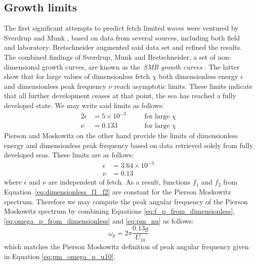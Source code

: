 \subsection{Growth limits}
%
The first significant attempts to predict fetch limited waves were ventured by
Sverdrup and Munk\cite{book:breakersandsurf1944}
\cite{book:breakersandsurfsupplement1945}, based on data from several sources, 
including both field and laboratory. Bretschneider 
\cite{article:Bretschneider1952} augmented said data set and refined the 
results. The combined findings of Sverdrup, Munk and Bretschneider, a set of 
non-dimensional growth curves, are known as the~\emph{SMB growth curves}
\cite{book:cerc1977}. The latter show that for large values of dimensionless 
fetch $\chi$ both dimensionless energy $\epsilon$ and dimensionless peak 
frequency $\nu$ reach asymptotic limits. These limits indicate that all further 
development ceases at that point, the sea has reached a fully developed state. 
We may write said limits as follows:
\begin{alignat}{2}
 \epsilon &= 5\times10^{-3} \quad && \text{for large } \chi \\
 \nu &= 0.133 \quad && \text{for large } \chi
\end{alignat}
Pierson and Moskowitz on the other hand provide the limits of dimensionless 
energy and dimensionless peak frequency based on data retrieved solely from 
fully developed seas. These limits are as follows:
\begin{align}
 \epsilon &= 3.64\times10^{-3} \\
 \nu &= 0.13 \label{eq:pm_nu}
\end{align}
where $\epsilon$ and $\nu$ are independent of fetch. As a result, functions 
$f_1$ and $f_2$ from Equation~\ref{eq:dimensionless_f1_f2} are constant for the 
Pierson Moskowitz spectrum. Therefore we may compute the peak angular frequency 
of the Pierson Moskowitz spectrum by 
combining Equations \ref{eq:f_p_from_dimensionless}, 
\ref{eq:omega_p_from_dimensionless} and \ref{eq:pm_nu} as follows:
\begin{equation}
 \omega_p = 2\pi\frac{0.13g}{U_{10}}
\end{equation}
which matches the Pierson Moskowitz definition of peak angular frequency
given in Equation \ref{eq:pm_omega_p_u10}.\\

